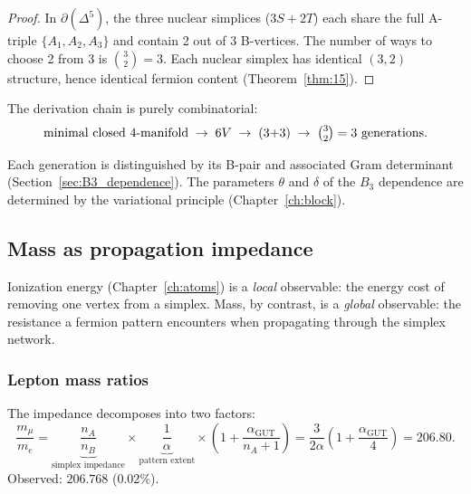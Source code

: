 \documentclass[12pt]{article}
\theoremstyle{remark}
\theoremstyle{definition}
\begin{document}
\begin{proof}
In $\partial(\Delta^5)$, the three nuclear simplices ($3S + 2T$) each share the full A-triple $\{A_1, A_2, A_3\}$ and contain 2 out of 3 B-vertices. The number of ways to choose 2 from 3 is $\binom{3}{2} = 3$.  Each nuclear simplex has identical $(3,2)$ structure, hence identical fermion content (Theorem~\ref{thm:15}).
\end{proof}

The derivation chain is purely combinatorial:
\begin{equation}
\text{minimal closed $4$-manifold} \;\to\; 6V \;\to\; (3{+}3) \;\to\; \tbinom{3}{2} = 3 \text{ generations}.
\end{equation}

Each generation is distinguished by its B-pair and associated Gram determinant (Section~\ref{sec:B3_dependence}).  The parameters $\theta$ and $\delta$ of the $B_3$ dependence are determined by the variational principle (Chapter~\ref{ch:block}).

\subsection{Mass as propagation impedance}
\label{sec:mass_impedance}

Ionization energy (Chapter~\ref{ch:atoms}) is a \emph{local} observable: the energy cost of removing one vertex from a simplex.  Mass, by contrast, is a \emph{global} observable: the resistance a fermion pattern encounters when propagating through the simplex network.

\subsubsection{Lepton mass ratios}

The impedance decomposes into two factors:
\begin{equation}
\label{eq:mu_e}
\boxed{\frac{m_\mu}{m_e} = \underbrace{\frac{n_A}{n_B}}_{\text{simplex impedance}} \times \underbrace{\frac{1}{\alpha}}_{\text{pattern extent}} \times \left(1 + \frac{\alpha_\mathrm{GUT}}{n_A + 1}\right) = \frac{3}{2\alpha}\left(1 + \frac{\alpha_\mathrm{GUT}}{4}\right) = 206.80.}
\end{equation}
Observed: $206.768$ ($0.02\%$).
\end{document}
